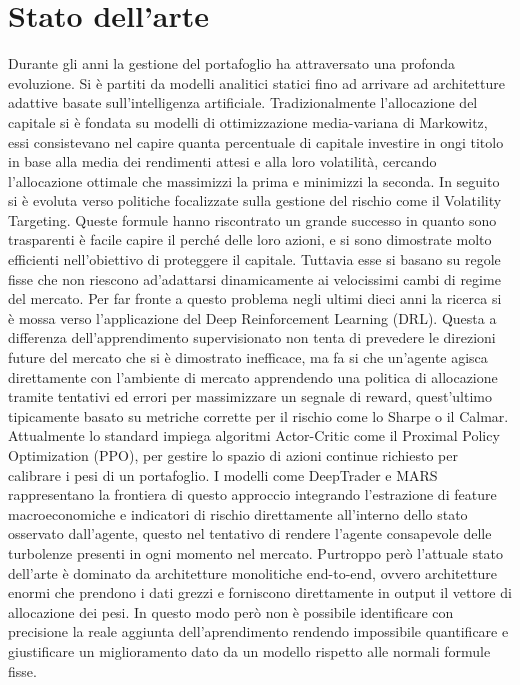 \section{Stato dell'arte}
\label{subsec:stateofart}
Durante gli anni la gestione del portafoglio ha attraversato una profonda evoluzione. 
Si è partiti da modelli analitici statici fino ad arrivare ad architetture adattive basate sull'intelligenza artificiale.
Tradizionalmente l'allocazione del capitale si è fondata su modelli di ottimizzazione media-variana di Markowitz, essi consistevano nel capire quanta percentuale di capitale investire in ongi titolo in base alla media dei rendimenti attesi e alla loro volatilità, cercando l'allocazione ottimale che massimizzi la prima e minimizzi la seconda.
In seguito si è evoluta verso politiche focalizzate sulla gestione del rischio come il Volatility Targeting.
Queste formule hanno riscontrato un grande successo in quanto sono trasparenti è facile capire il perché delle loro azioni, e si sono dimostrate molto efficienti nell'obiettivo di proteggere il capitale.
Tuttavia esse si basano su regole fisse che non riescono ad'adattarsi dinamicamente ai velocissimi cambi di regime del mercato.
Per far fronte a questo problema negli ultimi dieci anni la ricerca si è mossa verso l'applicazione del Deep Reinforcement Learning (DRL).
Questa a differenza dell'apprendimento supervisionato non tenta di prevedere le direzioni future del mercato che si è dimostrato inefficace, 
ma fa si che un'agente agisca direttamente con l'ambiente di mercato apprendendo una politica di allocazione tramite tentativi ed errori per massimizzare un segnale di reward, quest'ultimo tipicamente basato su metriche corrette per il rischio come lo Sharpe o il Calmar.
Attualmente lo standard impiega algoritmi Actor-Critic come il Proximal Policy Optimization (PPO), per gestire lo spazio di azioni continue richiesto
per calibrare i pesi di un portafoglio. I modelli come DeepTrader\citep{wang2021deeptrader} e MARS \citep{chen2026mars} rappresentano la frontiera di questo approccio integrando l'estrazione di feature macroeconomiche e indicatori di rischio direttamente all'interno dello stato osservato dall'agente, questo nel tentativo di rendere l'agente consapevole delle turbolenze presenti in ogni momento nel mercato.
Purtroppo però l'attuale stato dell'arte è dominato da architetture monolitiche end-to-end, ovvero architetture enormi che prendono i dati grezzi e forniscono direttamente in output il vettore di allocazione dei pesi. 
In questo modo però non è possibile identificare con precisione la reale aggiunta dell'aprendimento rendendo impossibile quantificare e giustificare un miglioramento dato da un modello rispetto alle normali formule fisse.


